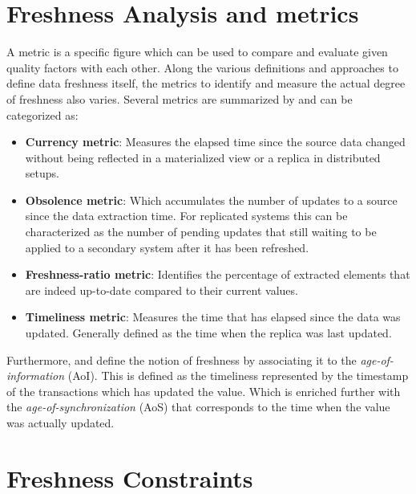 
\section{Freshness Analysis and metrics}
\label{r:freshness_metrics}
A metric is a specific figure which can be used to compare and evaluate given quality factors with each other.
Along the various definitions and approaches to define data freshness itself, the metrics to identify and measure the actual degree of freshness also varies.
Several metrics are summarized by \cite{cho:2000, pacitti:2000, peralta:2006} and can be categorized as:
\begin{itemize}
    \item \textbf{Currency metric}: Measures the elapsed time since the source data changed without being reflected in a materialized view or a replica in distributed setups.
    \item \textbf{Obsolence metric}: Which accumulates the number of updates to a source since the data extraction time. For replicated systems this can be characterized as the 
    number of pending updates that still waiting to be applied to a secondary system after it has been refreshed.
    \item \textbf{Freshness-ratio metric}: Identifies the percentage of extracted elements that are indeed up-to-date compared to their current values.
    \item \textbf{Timeliness metric}: Measures the time that has elapsed since the data was updated. Generally defined as the time when the replica was last updated.
\end{itemize}


Furthermore, \cite{bedewy:2016} and \cite{zhong:2018} define the notion of freshness by associating it to the \emph{age-of-information} (AoI).
This is defined as the timeliness represented by the timestamp of the transactions which has updated the value. 
Which is enriched further with the \emph{age-of-synchronization} (AoS) that corresponds to the time when the value was actually updated.




\section{Freshness Constraints}
\label{r:express_freshness}

